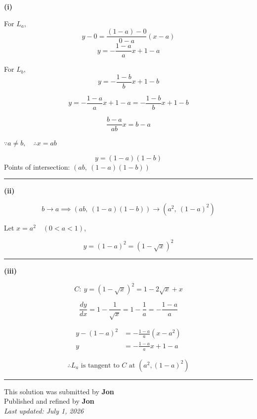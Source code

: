 \documentclass[12pt]{article}
\begin{document}
\newcommand{\ds}{\displaystyle}

\textbf{(i)}

For $L_a$,
$$y-0=\frac{(1-a)-0}{0-a}(x-a)$$
$$y=-\frac{1-a}{a}x+1-a$$

For $L_b$,
$$y=-\frac{1-b}{b}x+1-b$$


$$y=-\frac{1-a}{a}x+1-a=-\frac{1-b}{b}x+1-b$$

$$\frac{b-a}{ab}x=b-a$$

$\ds \because a\neq b,\quad \therefore x=ab$

$$y=(1-a)(1-b)$$
Points of intersection:  $ \ds (ab,\ (1-a)(1-b))$

\bigskip\hrule\bigskip
\textbf{(ii)}

$$b\to a\implies (ab,\ (1-a)(1-b))\to (a^2,\ (1-a)^2)$$

Let $\ds x=a^2\quad (0<a<1)$, 

$$y=(1-a)^2=(1-\sqrt{x})^2$$

\bigskip\hrule\bigskip
\textbf{(iii)}

$$C:\ y=(1-\sqrt{x})^2=1-2\sqrt{x}+x$$

$$\frac{dy}{dx}=1-\frac1{\sqrt{x}}=1-\frac1a=-\frac{1-a}{a}$$

\begin{align*}
y-(1-a)^2&=-\frac{1-a}{a}(x-a^2)\\
y&=-\frac{1-a}{a}x+1-a
\end{align*}

$$\therefore L_a \text{ is tangent to } C \text{ at } (a^2,(1-a)^2)$$

\bigskip
\hrule
\begin{center}
    This solution was submitted by \textbf{Jon}\\[4pt]
    Published and refined by \textbf{Jon}\\[8pt]
    \textit{Last updated: July 1, 2026}
\end{center}
\end{document}

